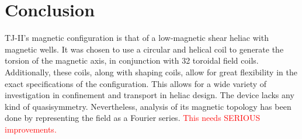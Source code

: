 \documentclass[a4paper]{article}
\newcommand\mynotes[1]{\textcolor{red}{#1}}
\begin{document}

\section*{Conclusion}
TJ-II's magnetic configuration is that of a low-magnetic shear heliac with magnetic wells.
It was chosen to use a circular and helical coil to generate the torsion of the magnetic axis, in conjunction with 32 toroidal field coils.
Additionally, these coils, along with shaping coils, allow for great flexibility in the exact specifications of the configuration.
This allows for a wide variety of investigation in confinement and transport in heliac design.
The device lacks any kind of quasisymmetry. Nevertheless, analysis of its magnetic topology has been done by representing the field as a Fourier series. \mynotes{This needs SERIOUS improvements.}




\end{document}
